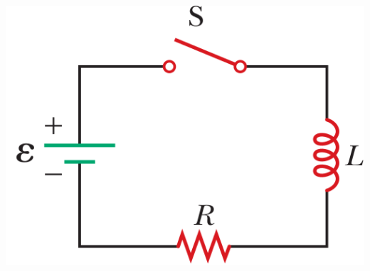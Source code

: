 \documentclass{officialexam}
\begin{document}
\begin{enumerate}[I]
\begin{enumerate}[m]
\begin{multicols}{2}
				\includegraphics[scale=0.25]{pic5}
			\end{multicols}
		\end{enumerate} 
	\end{enumerate}
\newpage
\borderline{\bigg[អត្រាកំណែវិញ្ញាសា រូបវិទ្យា\bigg]}\\
\end{document}
